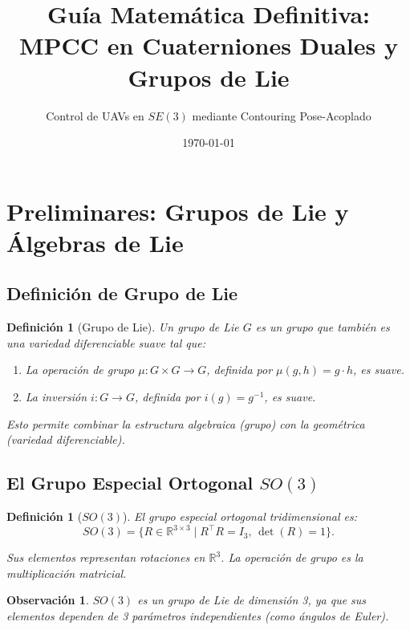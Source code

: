\documentclass[11pt,a4paper]{article}
\title{Guía Matemática Definitiva: MPCC en Cuaterniones Duales y Grupos de Lie}
\author{Control de UAVs en $SE(3)$ mediante Contouring Pose-Acoplado}
\date{\today}
\newtheorem{definition}[theorem]{Definición}
\newtheorem{remark}[theorem]{Observación}
\begin{document}
\maketitle
\tableofcontents
\newpage

\section{Preliminares: Grupos de Lie y Álgebras de Lie}
\label{sec:lie_preliminares}

\subsection{Definición de Grupo de Lie}

\begin{definition}[Grupo de Lie]
Un \emph{grupo de Lie} $G$ es un grupo que también es una variedad diferenciable suave tal que:
\begin{enumerate}
    \item La operación de grupo $\mu: G \times G \to G$, definida por $\mu(g,h) = g \cdot h$, es suave.
    \item La inversión $i: G \to G$, definida por $i(g) = g^{-1}$, es suave.
\end{enumerate}

Esto permite combinar la estructura algebraica (grupo) con la geométrica (variedad diferenciable).
\end{definition}

\subsection{El Grupo Especial Ortogonal $SO(3)$}

\begin{definition}[$SO(3)$]
El grupo especial ortogonal tridimensional es:
\begin{equation}
    SO(3) = \{ R \in \mathbb{R}^{3 \times 3} \mid R^\top R = I_3, \, \det(R) = 1 \}.
\end{equation}

Sus elementos representan rotaciones en $\mathbb{R}^3$. La operación de grupo es la multiplicación matricial.
\end{definition}

\begin{remark}
$SO(3)$ es un grupo de Lie de dimensión 3, ya que sus elementos dependen de 3 parámetros independientes (como ángulos de Euler).
\end{remark}
\end{document}
